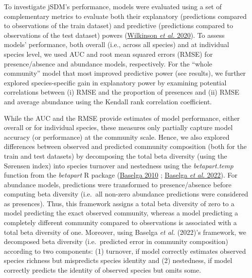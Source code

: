 \documentclass[9pt,biorxiv,doublespacing,lineno]{lapreprint}
\begin{document}
To investigate jSDM's performance, models were evaluated using a set of
complementary metrics to evaluate both their explanatory (predictions
compared to observations of the train dataset) and predictive
(predictions compared to observations of the test dataset) powers
(\protect\hyperlink{ref-Wilkinson_2020}{Wilkinson \emph{et al.} 2020}).
To assess models' performance, both overall (i.e., across all species)
and at individual species level, we used AUC and root mean squared
errors (RMSE) for presence/absence and abundance models, respectively.
For the ``whole community'' model that most improved predictive power
(see results), we further explored species-specific gain in explanatory
power by examining potential correlations between (i) RMSE and the
proportion of presences and (ii) RMSE and average abundance using the
Kendall rank correlation coefficient.

While the AUC and the RMSE provide estimates of model performance,
either overall or for individual species, these measures only partially
capture model accuracy (or performance) at the community scale. Hence,
we also explored differences between observed and predicted community
composition (both for the train and test datasets) by decomposing the
total beta diversity (using the Sørensen index) into species turnover
and nestedness using the \emph{betapart.temp} function from the
\emph{betapart} R package (\protect\hyperlink{ref-Baselga_2010}{Baselga
2010} ; \protect\hyperlink{ref-Baselga_2022}{Baselga \emph{et al.}
2022}). For abundance models, predictions were transformed to
presence/absence before computing beta diversity (i.e.~all non-zero
abundance predictions were considered as presences). Thus, this
framework assigns a total beta diversity of zero to a model predicting
the exact observed community, whereas a model predicting a completely
different community compared to observations is associated with a total
beta diversity of one. Moreover, using Baselga \emph{et al.} (2022)'s
framework, we decomposed beta diversity (i.e.~predicted error in
community composition) according to two components: (1) turnover, if
model correctly estimates observed species richness but mispredicts
species identity and (2) nestedness, if model correctly predicts the
identity of observed species but omits some.
\end{document}
